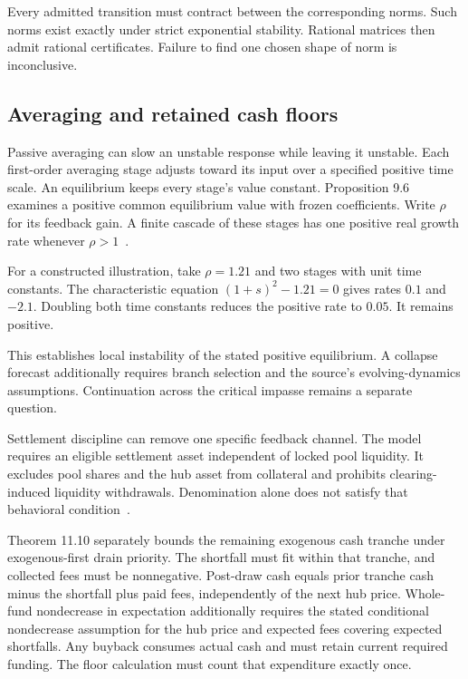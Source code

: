 \documentclass{momentum}
\begin{document}
Every admitted transition must contract between the corresponding norms. Such norms exist exactly under strict exponential stability. Rational matrices then admit rational certificates. Failure to find one chosen shape of norm is inconclusive.

\subsection{Averaging and retained cash floors}

Passive averaging can slow an unstable response while leaving it unstable. Each first-order averaging stage adjusts toward its input over a specified positive time scale. An equilibrium keeps every stage's value constant. Proposition 9.6 examines a positive common equilibrium value with frozen coefficients. Write $\rho$ for its feedback gain. A finite cascade of these stages has one positive real growth rate whenever $\rho>1$~\cite[\S9.1]{ccp}.

For a constructed illustration, take $\rho=1.21$ and two stages with unit time constants. The characteristic equation $(1+s)^2-1.21=0$ gives rates $0.1$ and $-2.1$. Doubling both time constants reduces the positive rate to $0.05$. It remains positive.

This establishes local instability of the stated positive equilibrium. A collapse forecast additionally requires branch selection and the source's evolving-dynamics assumptions. Continuation across the critical impasse remains a separate question.

Settlement discipline can remove one specific feedback channel. The model requires an eligible settlement asset independent of locked pool liquidity. It excludes pool shares and the hub asset from collateral and prohibits clearing-induced liquidity withdrawals. Denomination alone does not satisfy that behavioral condition~\cite[\S11.1]{ccp}.

Theorem 11.10 separately bounds the remaining exogenous cash tranche under exogenous-first drain priority. The shortfall must fit within that tranche, and collected fees must be nonnegative. Post-draw cash equals prior tranche cash minus the shortfall plus paid fees, independently of the next hub price. Whole-fund nondecrease in expectation additionally requires the stated conditional nondecrease assumption for the hub price and expected fees covering expected shortfalls. Any buyback consumes actual cash and must retain current required funding. The floor calculation must count that expenditure exactly once.
\end{document}
